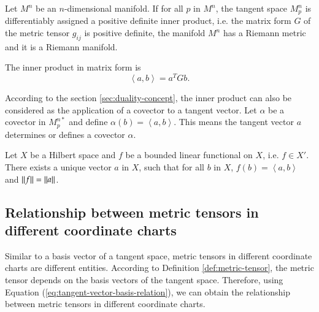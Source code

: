\documentclass[11pt, a4paper]{book}
\begin{document}
\begin{Definition}
  Let $M^n$ be an $n$-dimensional manifold. If for all $p$ in $M^n$, the tangent space
  $M_p^n$ is differentiably assigned a positive definite inner product, i.e. the matrix
  form $G$ of the metric tensor $g_{ij}$ is positive definite, the manifold $M^n$ has a
  Riemann metric and it is a Riemann manifold.
\end{Definition}

The inner product in matrix form is
\begin{equation}
  \left\langle a,b \right\rangle = a^T G b.
\end{equation}

According to the section \ref{sec:duality-concept}, the inner product can also be
considered as the application of a covector to a tangent vector. Let $\alpha$ be a
covector in $M_p^{n*}$ and define $\alpha(b) = \left\langle a, b \right\rangle$. This
means the tangent vector $a$ determines or defines a covector $\alpha$.

\begin{Theorem}
  Let $X$ be a Hilbert space and $f$ be a bounded linear functional on $X$, i.e.
  $f \in X'$. There exists a unique vector $a$ in $X$, such that for all $b$ in $X$,
  $f(b) = \left\langle a, b \right\rangle$ and $\lVert f\rVert = \lVert a\rVert$.
\end{Theorem}

\subsection{Relationship between metric tensors in different coordinate charts}

Similar to a basis vector of a tangent space, metric tensors in different coordinate
charts are different entities. According to Definition \ref{def:metric-tensor}, the metric
tensor depends on the basis vectors of the tangent space. Therefore, using Equation
(\ref{eq:tangent-vector-basis-relation}), we can obtain the relationship between metric
tensors in different coordinate charts.
\end{document}
